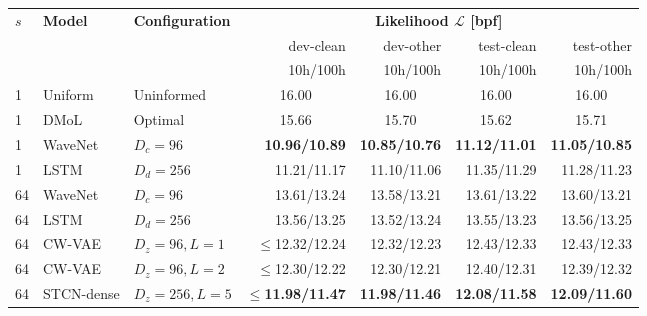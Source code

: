 {\begin{table*}[t]
\begin{adjustbox}{center, totalheight=0.182\paperheight}
    \begin{tabular}{lll|rrrr}  %
        \toprule
        $s$ & \bfseries Model                   & \bfseries Configuration       & \multicolumn{4}{c}{\bfseries Likelihood $\mathcal{L}$ [bpf]} \\
            & & & dev-clean & dev-other & test-clean & test-other\\
            & & & 10h/100h & 10h/100h & 10h/100h & 10h/100h\\
        \midrule
        1 & Uniform             & Uninformed     & \multicolumn{1}{c}{16.00} & \multicolumn{1}{c}{16.00} & \multicolumn{1}{c}{16.00} & \multicolumn{1}{c}{16.00} \\
        1 & DMoL                & Optimal        & \multicolumn{1}{c}{15.66} & \multicolumn{1}{c}{15.70} & \multicolumn{1}{c}{15.62} & \multicolumn{1}{c}{15.71}\\   %
        \midrule
        1 & WaveNet             & $D_c=96$       & \bfseries 10.96/10.89 & \bfseries 10.85/10.76 & \bfseries 11.12/11.01 & \bfseries 11.05/10.85 \\
        1 & LSTM                & $D_d=256$      & 11.21/11.17 & 11.10/11.06 & 11.35/11.29 & 11.28/11.23 \\  %
        \midrule
        64 & WaveNet            & $D_c=96$       & 13.61/13.24 & 13.58/13.21 & 13.61/13.22 & 13.60/13.21 \\  %
        64 & LSTM               & $D_d=256$      & 13.56/13.25 & 13.52/13.24 & 13.55/13.23 & 13.56/13.25 \\  %
        64 & CW-VAE             & $D_z=96,L=1$   & $\leq$12.32/12.24 & 12.32/12.23 & 12.43/12.33 & 12.43/12.33 \\
        64 & CW-VAE             & $D_z=96,L=2$   & $\leq$12.30/12.22 & 12.30/12.21 & 12.40/12.31 & 12.39/12.32 \\
        64 & STCN-dense         & $D_z=256,L=5$  & $\leq$\bfseries 11.98/11.47 & \bfseries 11.98/11.46 & \bfseries 12.08/11.58 & \bfseries 12.09/11.60 \\  %
        \bottomrule
    \end{tabular}
    \end{adjustbox}

\end{table*}}
